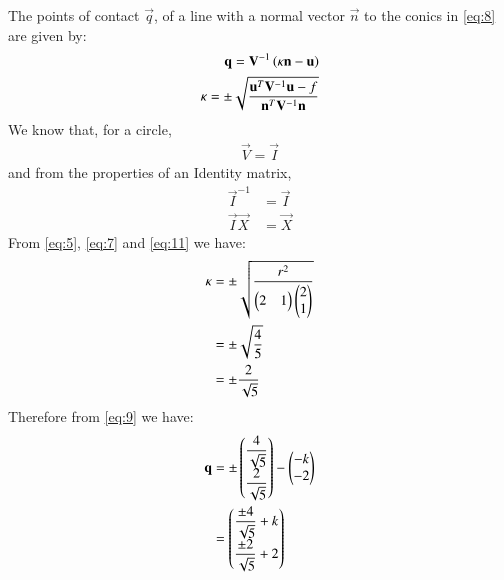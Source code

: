 \documentclass[journal,12pt,twocolumn]{IEEEtran}
\begin{document}
The points of contact $\vec{q}$, of a line with a normal vector $\vec{n}$ to the conics in \eqref{eq:8} are given by:
\begin{align}
\mathbf{q} = \mathbf{V}^{-1}\left(\kappa \mathbf{n}-\mathbf{u}\right) \label{eq:9} \\
\kappa = \pm \sqrt{\frac{\mathbf{u}^T\mathbf{V}^{-1}\mathbf{u}-f}{\mathbf{n}^T\mathbf{V}^{-1}\mathbf{n}}}\label{eq:10}
\end{align}
We know that, for a circle, 
\begin{align}
\vec{V} = \vec{I}\label{eq:11}  
\end{align}
and from the properties of an Identity matrix, 
\begin{align}
\vec{I}^{-1} &= \vec{I} \\
\vec{I}\vec{X} &= \vec{X}   
\end{align}
From \eqref{eq:5}, \eqref{eq:7} and \eqref{eq:11} we have:
\begin{align}
\kappa &= \pm \sqrt{\frac{r^2}{\begin{pmatrix}2 & 1 \end{pmatrix}\begin{pmatrix}2 \\ 1 \end{pmatrix}}} \\
&= \pm \sqrt{\frac{4}{5}} \\
& =  \pm \frac{2}{\sqrt{5}}
\end{align}
Therefore from \eqref{eq:9} we have:
\begin{align}
\mathbf{q} &= \pm \begin{pmatrix}\dfrac{4}{\sqrt{5}} \\ \dfrac{2}{\sqrt{5}} \end{pmatrix} - \begin{pmatrix}-k \\ -2\end{pmatrix} \\
&=\begin{pmatrix}\dfrac{\pm 4}{\sqrt{5}} +k \\\dfrac{\pm 2}{\sqrt{5}} +2\end{pmatrix}
\end{align}
\end{document}
